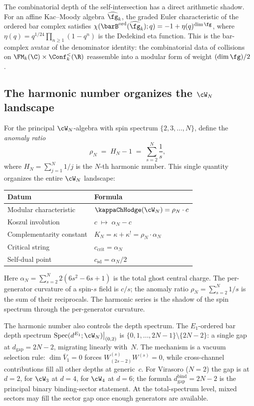 The combinatorial depth of the self-intersection has a direct
arithmetic shadow. For an affine Kac--Moody algebra
$\widehat\fg_k$, the graded Euler characteristic of the ordered
bar complex satisfies
$\chi(\barB^{\mathrm{ord}}(\widehat\fg_k); q) = -1 +
\eta(q)^{\dim\fg}$, where
$\eta(q) = q^{1/24}\prod_{n \geq 1}(1-q^n)$ is the Dedekind eta
function. This is the bar-complex avatar of the denominator
identity: the combinatorial data of collisions on
$\FM_k(\C) \times \Conf_k^{<}(\R)$ reassemble into a modular form
of weight $(\dim\fg)/2$.

\subsection{The harmonic number organizes the $\cW_N$ landscape}

\providecommand{\rhoN}{\rho_N}
\providecommand{\alphaN}{\alpha_N}

For the principal $\cW_N$-algebra with spin spectrum
$\{2,3,\ldots,N\}$, define the \emph{anomaly ratio}
\[
 \rhoN
 \;=\;
 H_N - 1
 \;=\;
 \sum_{s=2}^{N}\frac{1}{s},
\]
where $H_N = \sum_{j=1}^{N}1/j$ is the $N$-th harmonic number.
This single quantity organizes the entire $\cW_N$ landscape:
\begin{center}
\renewcommand{\arraystretch}{1.3}
\begin{tabular}{@{}ll@{}}
\textbf{Datum} & \textbf{Formula} \\
\hline
Modular characteristic & $\kappaChHodge(\cW_N) = \rhoN \cdot c$ \\
Koszul involution & $c \;\mapsto\; \alphaN - c$ \\
Complementarity constant & $K_N = \kappa + \kappa^! = \rhoN \cdot \alphaN$ \\
Critical string & $c_{\mathrm{crit}} = \alphaN$ \\
Self-dual point & $c_{\mathrm{sd}} = \alphaN/2$
\end{tabular}
\end{center}
Here $\alphaN = \sum_{s=2}^{N}2(6s^2-6s+1)$ is the total ghost
central charge. The per-generator curvature of a spin-$s$ field is
$c/s$; the anomaly ratio $\rhoN = \sum_{s=2}^{N}1/s$ is the sum of
their reciprocals. The harmonic series is the shadow of the spin
spectrum through the per-generator curvature.

The harmonic number also controls the depth spectrum. The
$E_1$-ordered bar depth spectrum
$\mathrm{Spec}(d^{E_1}; \cW_N)\big|_{(0,2)}$ is
$\{0,1,\ldots,2N{-}1\}\setminus\{2N{-}2\}$: a single gap at
$d_{\mathrm{gap}} = 2N{-}2$, migrating linearly with~$N$. The
mechanism is a vacuum selection rule: $\dim\bar{V}_1 = 0$ forces
$W^{(s)}_{(2s-2)}W^{(s)} = 0$, while cross-channel contributions
fill all other depths at generic~$c$. For Virasoro ($N=2$) the gap
is at $d=2$, for $\cW_3$ at $d=4$, for $\cW_4$ at $d=6$; the
formula \(d_{\mathrm{gap}}^{\mathrm{bind}}=2N{-}2\) is the
principal binary binding-sector statement.  At the total-spectrum level,
mixed sectors may fill the sector gap once enough generators are
available.

